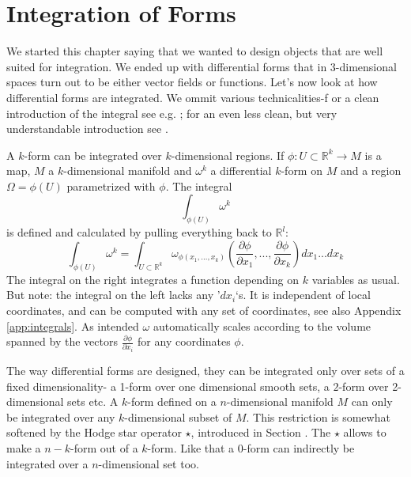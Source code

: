 \section{Integration of Forms}
\label{sec:integralOfForms}
 We started this chapter saying that we wanted to design objects that are well suited for integration. We ended up with differential forms that in 3-dimensional spaces turn out to be either vector fields or functions. Let's now look at how differential forms are integrated. We ommit various technicalities-f or a clean introduction of the integral see e.g. ; for an even less clean, but very understandable introduction see .

A $k$-form can be integrated over $k$-dimensional regions. If $\phi : U \subset \mathbb R^k \to M$ is a map, $M$ a $k$-dimensional manifold and $\omega^k$ a differential $k$-form on $M$ and a region $\Omega = \phi(U)$ parametrized with $\phi$. The integral 
\[\int_{\phi(U)} \omega^k \]
is defined and calculated by pulling everything back to $\mathbb R^l$:
\[\int_{\phi(U)} \omega^k = \int_{U\subset\mathbb R^k} \omega_{\phi(x_1,...,x_k)}(\frac{\partial \phi}{\partial x_1},...,\frac{\partial \phi}{\partial x_k}) d x_1...d x_k\]
The integral on the right integrates a function depending on $k$ variables as usual. But note: the integral on the left  lacks any '$d x_i$`s. It is independent of local coordinates, and can be computed with any set of coordinates, see also Appendix \ref{app:integrals}. As intended $\omega$ automatically scales according to the volume spanned by the vectors $\frac{\partial \phi}{\partial x_i}$ for any coordinates $\phi$. 

The way differential forms are designed, they can be integrated only over sets of a fixed dimensionality- a 1-form over one dimensional smooth sets, a $2$-form over 2-dimensional sets etc. A $k$-form defined on a $n$-dimensional manifold $M$ can only be integrated over any $k$-dimensional subset of $M$. This restriction is somewhat softened by the Hodge star operator $\star$, introduced in Section . The $\star$ allows to make a $n-k$-form out of a $k$-form. Like that a $0$-form can indirectly be integrated over a $n$-dimensional set too.

